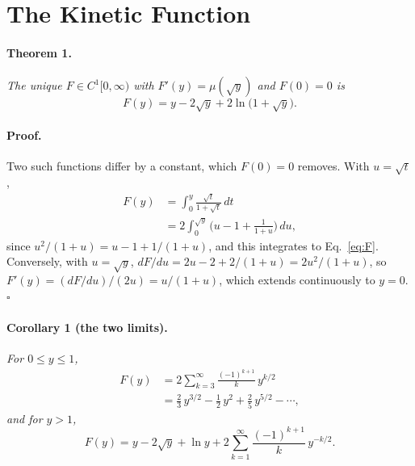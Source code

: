 \documentclass[twocolumn]{iopjournal}
\begin{document}

\section*{The Kinetic Function}

\paragraph{Theorem 1.} \textit{The unique $F \in C^1[0,\infty)$
with $F'(y) = \mu(\sqrt y)$ and $F(0) = 0$ is}
\begin{equation}
  \boxed{F(y) = y - 2\sqrt y + 2\ln\!\big(1 + \sqrt y\big).}
  \label{eq:F}
\end{equation}

\paragraph{Proof.} Two such functions differ by a constant, which
$F(0) = 0$ removes. With $u = \sqrt t$,
\begin{equation}
\begin{aligned}
  F(y) &= \int_0^y \frac{\sqrt t}{1 + \sqrt t}\,dt \\
  &= 2\int_0^{\sqrt y}\Big(u - 1 + \frac{1}{1+u}\Big)\,du,
\end{aligned}
\end{equation}
since $u^2/(1+u) = u - 1 + 1/(1+u)$, and this integrates to
Eq.~\eqref{eq:F}. Conversely, with $u = \sqrt y$,
$dF/du = 2u - 2 + 2/(1+u) = 2u^2/(1+u)$, so
$F'(y) = (dF/du)/(2u) = u/(1+u)$, which extends continuously to
$y = 0$. \hfill $\square$

\paragraph{Corollary 1 (the two limits).} \textit{For
$0 \le y \le 1$,}
\begin{equation}
\begin{aligned}
  F(y) &= 2\sum_{k=3}^{\infty} \frac{(-1)^{k+1}}{k}\, y^{k/2} \\
       &= \tfrac23\, y^{3/2} - \tfrac12\, y^2 + \tfrac25\, y^{5/2}
         - \cdots,
\end{aligned}
  \label{eq:small}
\end{equation}
\textit{and for $y > 1$,}
\begin{equation}
  F(y) = y - 2\sqrt y + \ln y
       + 2\sum_{k=1}^{\infty} \frac{(-1)^{k+1}}{k}\, y^{-k/2}.
  \label{eq:large}
\end{equation}
\end{document}
